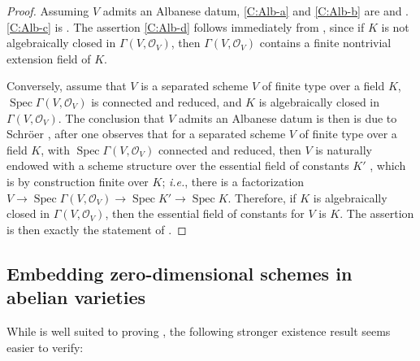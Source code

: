 \documentclass[11pt, reqno]{amsart}
\numberwithin{equation}{section}
\theoremstyle{definition}
\theoremstyle{remark}
\begin{document}
\begin{proof}Assuming $V$ admits an Albanese datum,  \ref{C:Alb-a} and
  \ref{C:Alb-b} are  and  . \ref{C:Alb-c}
  is .  The assertion \ref{C:Alb-d} follows immediately from
  , since if $K$ is not algebraically closed in
  $\Gamma(V,\mathcal O_V)$, then $\Gamma(V,\mathcal O_V)$ contains a
  finite nontrivial extension field of $K$. 


Conversely, assume that  $V$ is a separated scheme $V$ of finite type over a field $K$,    $\operatorname{Spec}\Gamma(V,\mathcal O_V)$ is connected and reduced, and $K$ is algebraically closed in $\Gamma(V,\mathcal O_V)$.
The conclusion that $V$ admits an Albanese datum is then is due to Schr\"oer \cite[Thm.~p.2]{schroeralbanese}, after one observes that for a separated scheme $V$ of finite type over a field $K$, with $\operatorname{Spec} \Gamma (V,\mathcal O_V)$ connected and reduced, then $V$ is naturally endowed with a scheme structure over the essential field of constants $K'$ \cite[p.19]{schroeralbanese}, which is by construction finite over $K$; \emph{i.e.}, there is a factorization  $V \to \operatorname{Spec}\Gamma(V,\mathcal O_V)\to  \operatorname{Spec} K'\to  \operatorname{Spec} K$.
Therefore, if $K$ is algebraically closed in $\Gamma(V,\mathcal O_V)$, then the essential field of constants for $V$ is $K$. The assertion is then exactly the statement of \cite[Thm.~p.2]{schroeralbanese}.
\end{proof}





\subsection{Embedding zero-dimensional schemes in abelian varieties}\label{S:embed}

While   is well suited to proving 
, the following stronger existence result seems easier to verify:
\end{document}
